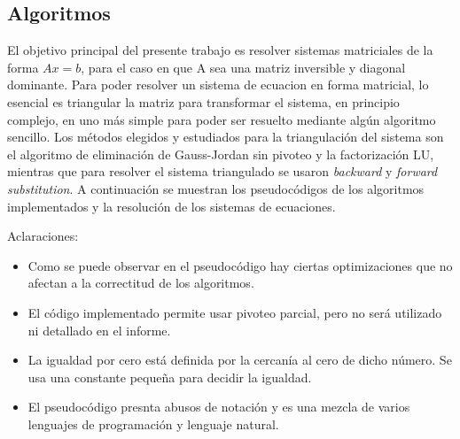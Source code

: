\subsection{Algoritmos}

El objetivo principal del presente trabajo es resolver sistemas matriciales de la forma $Ax = b$, para el caso en que A sea una matriz inversible y diagonal dominante. Para poder resolver un sistema de ecuacion en forma matricial, lo esencial es triangular la matriz para transformar el sistema, en principio complejo, en uno más simple para poder ser resuelto mediante algún algoritmo sencillo.
Los métodos elegidos y estudiados para la triangulación del sistema son el algoritmo de eliminación de Gauss-Jordan sin pivoteo y la factorización LU, mientras que para resolver el sistema triangulado se usaron \emph{backward} y \emph{forward} \emph{substitution}. A continuación se muestran los pseudocódigos de los algoritmos implementados y la resolución de los sistemas de ecuaciones.

%

Aclaraciones:
\begin{itemize}
\item Como se puede observar en el pseudocódigo hay ciertas optimizaciones que no afectan a la correctitud de los algoritmos.
\item El código implementado permite usar pivoteo parcial, pero no será utilizado ni detallado en el informe.
\item La igualdad por cero está definida por la cercanía al cero de dicho número. Se usa una constante pequeña para decidir la igualdad.
\item El pseudocódigo presnta abusos de notación y es una mezcla de varios lenguajes de programación y lenguaje natural.
\end{itemize}







